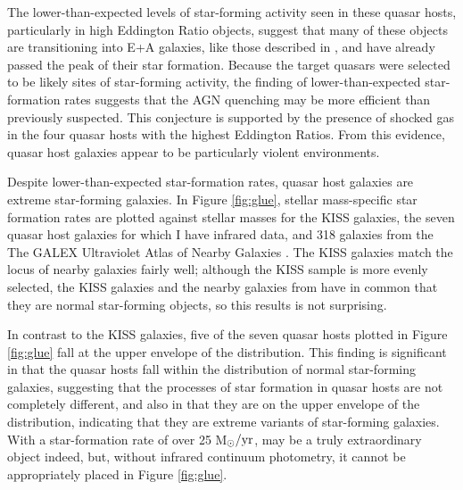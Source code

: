 The lower-than-expected levels of star-forming activity seen in these quasar hosts, particularly in high Eddington Ratio objects, suggest that many of these objects are transitioning into E+A galaxies, like those described in \cite{Cales}, and have already passed the peak of their star formation.  Because the target quasars were selected to be likely sites of star-forming activity, the finding of lower-than-expected star-formation rates suggests that the AGN quenching may be more efficient than previously suspected.  This conjecture is supported by the presence of shocked gas in the four quasar hosts with the highest Eddington Ratios. From this evidence, quasar host galaxies appear to be particularly violent environments.

Despite lower-than-expected star-formation rates, quasar host galaxies are extreme star-forming galaxies.  In Figure \ref{fig:glue}, stellar mass-specific star formation rates are plotted against stellar masses for the KISS galaxies, the seven quasar host galaxies for which I have infrared data, and 318 galaxies from the The GALEX Ultraviolet Atlas of Nearby Galaxies \citep{GildePaz}. The KISS galaxies match the locus of nearby galaxies fairly well; although the KISS sample is more evenly selected, the KISS galaxies and the nearby galaxies from \cite{GildePaz} have in common that they are normal star-forming objects, so this results is not surprising.

In contrast to the KISS galaxies, five of the seven quasar hosts plotted in Figure \ref{fig:glue} fall at the upper envelope of the distribution. This finding is significant in that the quasar hosts fall within the distribution of normal star-forming galaxies, suggesting that the processes of star formation in quasar hosts are not completely different, and also in that they are on the upper envelope of the distribution, indicating that they are extreme variants of star-forming galaxies. With a star-formation rate of over 25 M$_\odot/{\rm yr}$,  may be a truly extraordinary object indeed, but, without infrared continuum photometry, it cannot be appropriately placed in Figure \ref{fig:glue}.

